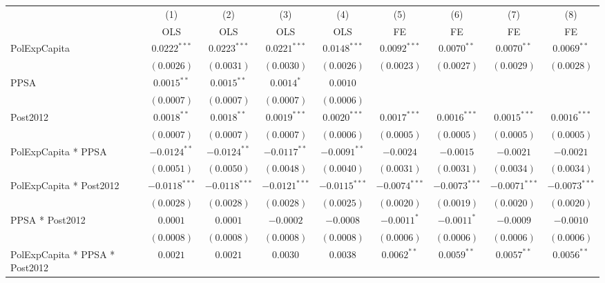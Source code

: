 \documentclass[border=10pt,varwidth=25cm]{standalone}
\renewenvironment{table}[1][]{}{}
\begin{document}
\begin{table}[H]
    \centering
    \scriptsize
    \begin{minipage}{\textwidth}
    \centering
    \begin{tabular}{lcccccccc}
        \toprule
         & (1) & (2) & (3) & (4) & (5) & (6) & (7) & (8) \\
         & OLS & OLS & OLS & OLS & FE & FE & FE & FE \\
        \midrule
        PolExpCapita & $0.0222^{***}$ & $0.0223^{***}$ & $0.0221^{***}$ & $0.0148^{***}$ & $0.0092^{***}$ & $0.0070^{**}$ & $0.0070^{**}$ & $0.0069^{**}$ \\
         & $(0.0026)$ & $(0.0031)$ & $(0.0030)$ & $(0.0026)$ & $(0.0023)$ & $(0.0027)$ & $(0.0029)$ & $(0.0028)$ \\[4pt]
        PPSA & $0.0015^{**}$ & $0.0015^{**}$ & $0.0014^{*}$ & $0.0010$ &  &  &  &  \\
         & $(0.0007)$ & $(0.0007)$ & $(0.0007)$ & $(0.0006)$ &  &  &  &  \\[4pt]
        Post2012 & $0.0018^{**}$ & $0.0018^{**}$ & $0.0019^{***}$ & $0.0020^{***}$ & $0.0017^{***}$ & $0.0016^{***}$ & $0.0015^{***}$ & $0.0016^{***}$ \\
         & $(0.0007)$ & $(0.0007)$ & $(0.0007)$ & $(0.0006)$ & $(0.0005)$ & $(0.0005)$ & $(0.0005)$ & $(0.0005)$ \\[4pt]
        PolExpCapita * PPSA & $-0.0124^{**}$ & $-0.0124^{**}$ & $-0.0117^{**}$ & $-0.0091^{**}$ & $-0.0024$ & $-0.0015$ & $-0.0021$ & $-0.0021$ \\
         & $(0.0051)$ & $(0.0050)$ & $(0.0048)$ & $(0.0040)$ & $(0.0031)$ & $(0.0031)$ & $(0.0034)$ & $(0.0034)$ \\[4pt]
        PolExpCapita * Post2012 & $-0.0118^{***}$ & $-0.0118^{***}$ & $-0.0121^{***}$ & $-0.0115^{***}$ & $-0.0074^{***}$ & $-0.0073^{***}$ & $-0.0071^{***}$ & $-0.0073^{***}$ \\
         & $(0.0028)$ & $(0.0028)$ & $(0.0028)$ & $(0.0025)$ & $(0.0020)$ & $(0.0019)$ & $(0.0020)$ & $(0.0020)$ \\[4pt]
        PPSA * Post2012 & $0.0001$ & $0.0001$ & $-0.0002$ & $-0.0008$ & $-0.0011^{*}$ & $-0.0011^{*}$ & $-0.0009$ & $-0.0010$ \\
         & $(0.0008)$ & $(0.0008)$ & $(0.0008)$ & $(0.0008)$ & $(0.0006)$ & $(0.0006)$ & $(0.0006)$ & $(0.0006)$ \\[4pt]
        PolExpCapita * PPSA * Post2012 & $0.0021$ & $0.0021$ & $0.0030$ & $0.0038$ & $0.0062^{**}$ & $0.0059^{**}$ & $0.0057^{**}$ & $0.0056^{**}$ \\

\end{tabular}
\end{minipage}
\end{table}
\end{document}
